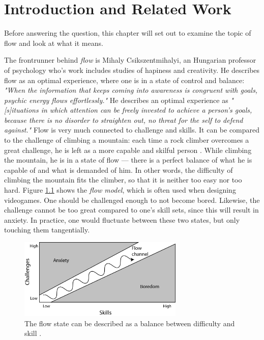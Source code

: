 \chapter{Introduction and Related Work}
Before answering the question, this chapter will set out to examine the topic of flow and look at what it means.

The frontrunner behind \textit{flow} is Mihaly Csikszentmihalyi, an Hungarian professor of psychology who's work includes studies of hapiness and creativity. He describes flow as an optimal experience, where one is in a state of control and balance: \textit{"When the information that keeps coming into awareness is congruent with goals, psychic energy flows effortlessly."} \citep{flow} He describes an optimal experience as \textit{"[s]ituations in which attention can be freely invested to achieve a person's goals, because there is no disorder to straighten out, no threat for the self to defend against."} \citep{flow} Flow is very much connected to challenge and skills. It can be compared to the challenge of climbing a mountain: each time a rock climber overcomes a great challenge, he is left as a more capable and skilful person \citep{flow}. While climbing the mountain, he is in a state of flow --- there is a perfect balance of what he is capable of and what is demanded of him. In other words, the difficulty of climbing the mountain fits the climber, so that it is neither too easy nor too hard. Figure \ref{fig:flowModel} shows the \textit{flow model}, which is often used when designing videogames. One should be challenged enough to not become bored. Likewise, the challenge cannot be too great compared to one's skill sets, since this will result in anxiety. In practice, one would fluctuate between these two states, but only touching them tangentially.

\begin{figure}[htbp]
\centering
\includegraphics[width=0.70\textwidth]{Pictures/flow_model}
\caption{The flow state can be described as a balance between difficulty and skill \citep{artOfGameDesign}.}
\label{fig:flowModel}
\end{figure}

